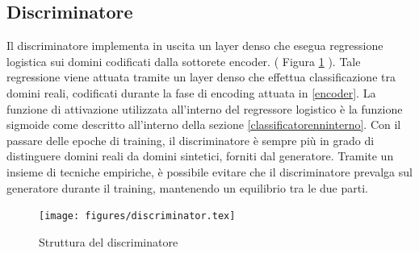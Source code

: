 \subsection{Discriminatore}
\label{discriminator}
Il discriminatore implementa in uscita un layer denso che esegua regressione logistica sui domini codificati dalla sottorete encoder. ( Figura \ref{fig:discriminator} ). Tale regressione viene attuata tramite un layer denso che effettua classificazione tra domini reali, codificati durante la fase di encoding attuata in \ref{encoder}. La funzione di attivazione utilizzata all'interno del regressore logistico è la funzione sigmoide come descritto all'interno della sezione \ref{classificatorenninterno}. Con il passare delle epoche di training, il discriminatore è sempre più in grado di distinguere domini reali da domini sintetici, forniti dal generatore. Tramite un insieme di tecniche empiriche, è possibile evitare che il discriminatore prevalga sul generatore durante il training, mantenendo un equilibrio tra le due parti.

\begin{figure}[!ht]
    \centering
	\texttt{[image: figures/discriminator.tex]}
	\caption{Struttura del discriminatore}
\label{fig:discriminator}
\end{figure}



